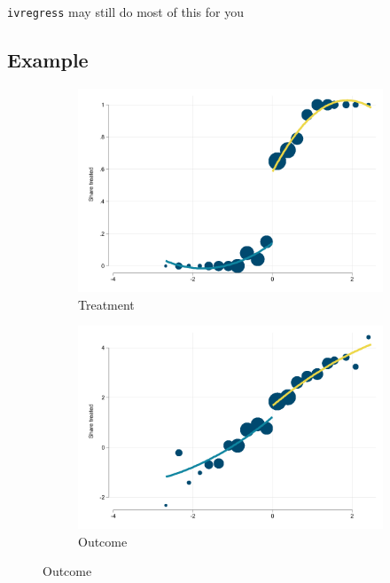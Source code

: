 \documentclass[
  letterpaper,
  DIV=11,
  numbers=noendperiod]{scrartcl}
\begin{document}
\texttt{ivregress} may still do most of this for you

\subsection{Example}\label{example-2}

\begin{figure}

\begin{minipage}[t]{0.50\linewidth}

\begin{figure}

{\centering \includegraphics{resources/frdd1.png}

}
\caption{Treatment}

\end{figure}%

\end{minipage}%
%
\begin{minipage}[t]{0.50\linewidth}

\begin{figure}

{\centering \includegraphics{resources/frdd2.png}

}
\caption{Outcome}

\end{figure}%

\end{minipage}%

\end{figure}%
\end{document}
